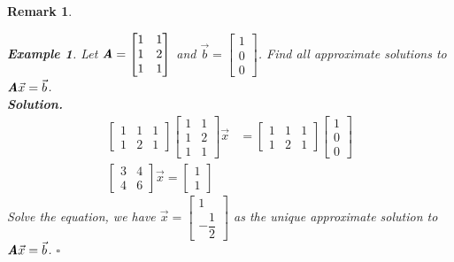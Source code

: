\documentclass[12pt, a4paper]{article}
\newtheorem{eg}{Example}[subsection]
\newenvironment*{sol}{\indent\textbf{Solution. }}{\hfill{$\square$}\par}
\newtheorem*{rmk}{\indent Remark}
\def\vecx{\vec{x}}
\def\vecb{\vec{b}}
\def\matrixA{\textbf{\emph{A}}}
\begin{document}
\begin{rmk}
	\begin{eg}
		Let $\matrixA=\begin{bmatrix}1&1\\1&2\\1&1\end{bmatrix}$ and $\vecb=\begin{bmatrix}1\\0\\0\end{bmatrix}$. Find all approximate solutions to $\matrixA\vecx=\vecb$.\\ 
		\begin{sol}
			$$\begin{aligned}
				\begin{bmatrix}1&1&1\\1&2&1\end{bmatrix}\begin{bmatrix}1&1\\1&2\\1&1\end{bmatrix}\vecx&=\begin{bmatrix}1&1&1\\1&2&1\end{bmatrix}\begin{bmatrix}1\\0\\0\end{bmatrix}\\
				\begin{bmatrix}3&4\\4&6\end{bmatrix}\vecx=\begin{bmatrix}1\\1\end{bmatrix}
			\end{aligned}$$
			Solve the equation, we have $\vecx=\begin{bmatrix}1\\-\dfrac{1}{2}\end{bmatrix}$ as the unique approximate solution to $\matrixA\vecx=\vecb$.
		\end{sol}
	\end{eg}
\end{rmk}
\end{document}
